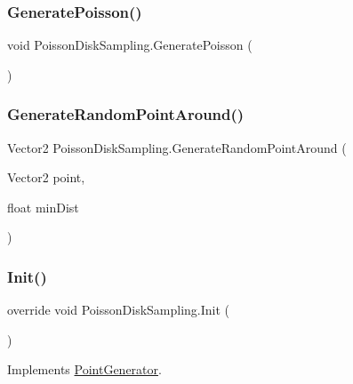 \subsubsection{\texorpdfstring{Generate\+Poisson()}{GeneratePoisson()}}
{\footnotesize\ttfamily void Poisson\+Disk\+Sampling.\+Generate\+Poisson (\begin{DoxyParamCaption}{ }\end{DoxyParamCaption})}

\mbox{\label{class_poisson_disk_sampling_aadc97855167d6531a56c9099101877d0}} 
\subsubsection{\texorpdfstring{Generate\+Random\+Point\+Around()}{GenerateRandomPointAround()}}
{\footnotesize\ttfamily Vector2 Poisson\+Disk\+Sampling.\+Generate\+Random\+Point\+Around (\begin{DoxyParamCaption}\item[{Vector2}]{point,  }\item[{float}]{min\+Dist }\end{DoxyParamCaption})}

\mbox{\label{class_poisson_disk_sampling_a1a571483a8940424916aa1266576161e}} 
\subsubsection{\texorpdfstring{Init()}{Init()}\hspace{0.1cm}{\footnotesize\ttfamily [1/2]}}
{\footnotesize\ttfamily override void Poisson\+Disk\+Sampling.\+Init (\begin{DoxyParamCaption}{ }\end{DoxyParamCaption})\hspace{0.3cm}{\ttfamily [virtual]}}



Implements \mbox{\hyperlink{class_point_generator_ae254f890c9a38d044d77f981e0dfeb68}{Point\+Generator}}.

